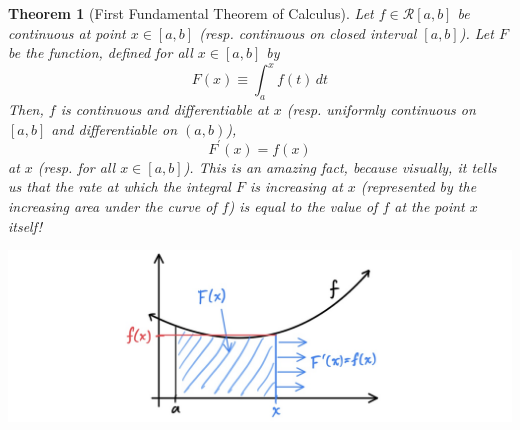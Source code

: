 \documentclass{article}
\newtheorem{theorem}{Theorem}[section]
\theoremstyle{remark}
\theoremstyle{definition}
\begin{document}
\begin{theorem}[First Fundamental Theorem of Calculus]
Let $f \in \mathcal{R}[a, b]$ be continuous at point $x \in [a, b]$ (resp. continuous on closed interval $[a, b]$). Let $F$ be the function, defined for all $x \in [a, b]$ by 
\[F(x) \equiv \int_a^x f(t)\,dt\]
Then, $f$ is continuous and differentiable at $x$ (resp. uniformly continuous on $[a, b]$ and differentiable on $(a, b)$), 
\[F^\prime (x) = f(x)\]
at $x$ (resp. for all $x \in [a, b]$). This is an amazing fact, because visually, it tells us that the rate at which the integral $F$ is increasing at $x$ (represented by the increasing area under the curve of $f$) is equal to the value of $f$ at the point $x$ itself! 
\begin{center}
    \includegraphics[scale=0.32]{img/First_Fundamental_Theorem_Analysis.jpg}
\end{center}
\end{theorem}
\end{document}
